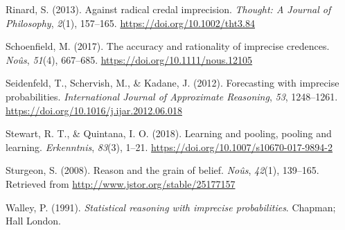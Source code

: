 \documentclass[
  10pt,
  dvipsnames,enabledeprecatedfontcommands]{scrartcl}
\newlength{\cslhangindent}
\newlength{\cslentryspacingunit} %
\newenvironment{CSLReferences}[2] %
 {%
  \setlength{\parindent}{0pt}
  \ifodd #1
  \let\oldpar\par
  \def\par{\hangindent=\cslhangindent\oldpar}
  \fi
  \setlength{\parskip}{#2\cslentryspacingunit}
 }%
 {}
\begin{document}
\begin{CSLReferences}{1}{0}
\leavevmode{}%
Rinard, S. (2013). Against radical credal imprecision. \emph{Thought: A
Journal of Philosophy}, \emph{2}(1), 157--165.
\url{https://doi.org/10.1002/tht3.84}

\leavevmode{}%
Schoenfield, M. (2017). The accuracy and rationality of imprecise
credences. \emph{Noûs}, \emph{51}(4), 667--685.
\url{https://doi.org/10.1111/nous.12105}

\leavevmode{}%
Seidenfeld, T., Schervish, M., \& Kadane, J. (2012). Forecasting with
imprecise probabilities. \emph{International Journal of Approximate
Reasoning}, \emph{53}, 1248--1261.
\url{https://doi.org/10.1016/j.ijar.2012.06.018}

\leavevmode{}%
Stewart, R. T., \& Quintana, I. O. (2018). Learning and pooling, pooling
and learning. \emph{Erkenntnis}, \emph{83}(3), 1--21.
\url{https://doi.org/10.1007/s10670-017-9894-2}

\leavevmode{}%
Sturgeon, S. (2008). Reason and the grain of belief. \emph{No{û}s},
\emph{42}(1), 139--165. Retrieved from
\url{http://www.jstor.org/stable/25177157}

\leavevmode{}%
Walley, P. (1991). \emph{Statistical reasoning with imprecise
probabilities}. Chapman; Hall London.

\end{CSLReferences}
\end{document}
